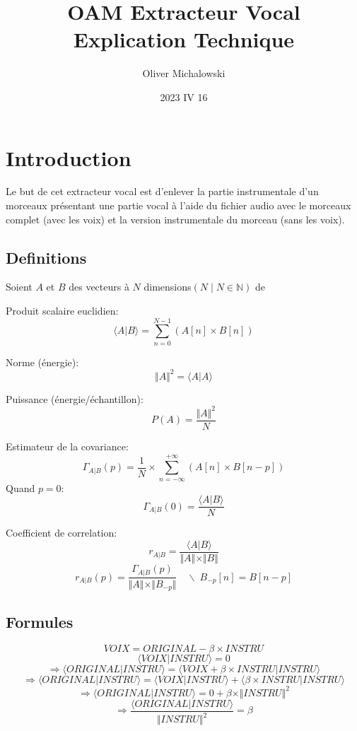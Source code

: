 \documentclass[10pt]{article}
\title{OAM Extracteur Vocal\\Explication Technique}
\author{Oliver Michalowski}
\date{2023 IV 16}
\begin{document}
\maketitle
\tableofcontents

\section{Introduction}
	Le but de cet extracteur vocal est d'enlever la partie instrumentale d'un morceaux présentant
	une partie vocal à l'aide du fichier audio avec le morceaux complet (avec les voix) et la version 
	instrumentale du morceau (sans les voix).
	
	\subsection{Definitions}
		Soient \(A\) et \(B\) des vecteurs à \(N\) dimensions\((N \mid N \in \mathbb{N}) \) de
		
		Produit scalaire euclidien:
		\[\langle A \vert B \rangle = \sum^{N-1}_{n = 0}{(A[n] \times B[n])}\]
		
		Norme (énergie):
		\[\Vert A \Vert^{2} = \langle A \vert A \rangle \]
		
		Puissance (énergie/échantillon):
		\[P(A) = \frac{\Vert A \Vert^{2}}{N}\]
		
		Estimateur de la covariance:
		\[
			\Gamma_{A \vert B}(p) = \frac{1}{N} \times \sum^{+\infty}_{n=-\infty}{(A[n] \times B[n-p])}
		\]
		Quand \(p = 0\):
		\[
			\Gamma_{A \vert B}(0) = \frac{\langle A \vert B \rangle}{N}
		\]
		
		Coefficient de correlation:
		\[
			r_{A \vert B} = \frac{\langle A \vert B \rangle}{\Vert A \Vert \times \Vert B \Vert}
		\]
		\[
			r_{A \vert B}(p) = \frac{\Gamma_{A \vert B}(p)}{\Vert A \Vert \times \Vert B_{-p} \Vert} \quad \backslash \; B_{-p}[n] = B[n - p]
		\]
		

	\subsection{Formules}
		\[VOIX = ORIGINAL - \beta \times INSTRU\]
		\[ \langle VOIX \vert INSTRU \rangle = 0 \]
		\[
			  \Rightarrow  	\langle ORIGINAL						\vert INSTRU \rangle 
			= 				\langle VOIX + \beta \times INSTRU 	\vert INSTRU \rangle
		\]
		\[
			  \Rightarrow  	\langle ORIGINAL				\vert INSTRU \rangle 
			= 				\langle VOIX 				\vert INSTRU \rangle
			+ 				\langle \beta \times INSTRU 	\vert INSTRU \rangle
		\]
		\[
			  \Rightarrow  \langle ORIGINAL \vert INSTRU \rangle 
			= 0
			+ \beta \times \Vert INSTRU \Vert ^{2}
		\]
		\[
			  \Rightarrow  \frac{\langle ORIGINAL \vert INSTRU \rangle}{\Vert INSTRU \Vert ^{2}}
			= \beta
		\]
\end{document}

